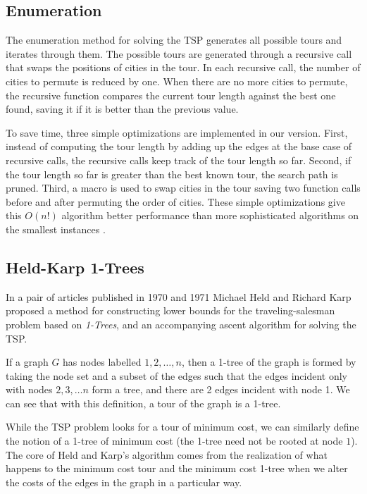 \documentclass[11pt]{article}
\begin{document}
	\subsection{Enumeration}
	The enumeration method for solving the TSP generates all possible tours and iterates through them. The possible tours are generated through a recursive call that swaps the positions of cities in the tour. In each recursive call, the number of cities to permute is reduced by one. When there are no more cities to permute, the recursive function compares the current tour length against the best one found, saving it if it is better than the previous value. 
	
	To save time, three simple optimizations are implemented in our version. First, instead of computing the tour length by adding up the edges at the base case of recursive calls, the recursive calls keep track of the tour length so far. Second, if the tour length so far is greater than the best known tour, the search path is pruned. Third, a macro is used to swap cities in the tour saving two function calls before and after permuting the order of cities. These simple optimizations give this $O(n!)$ algorithm better performance than more sophisticated algorithms on the smallest instances \cite{bico-1}.
	
	\subsection{Held-Karp 1-Trees}
	
	In a pair of articles published in 1970 and 1971 \cite{OneTree70,OneTree71} Michael Held and Richard Karp proposed a method for constructing lower bounds for the traveling-salesman problem based on \emph{1-Trees}, and an accompanying ascent algorithm for solving the TSP.
	
	If a graph $G$ has nodes labelled $1, 2, \dots, n$, then a 1-tree of the graph is formed by taking the node set and a subset of the edges such that the edges incident only with nodes $2, 3, \dots n$ form a tree, and there are 2 edges incident with node 1. We can see that with this definition, a tour of the graph is  a 1-tree.
	
	While the TSP problem looks for a tour of minimum cost, we can similarly define the notion of a 1-tree of minimum cost (the 1-tree need not be rooted at node $1$). The core of Held and Karp's algorithm comes from the realization of what happens to the minimum cost tour and the minimum cost 1-tree when we alter the costs of the edges in the graph in a particular way.
	
\end{document}
